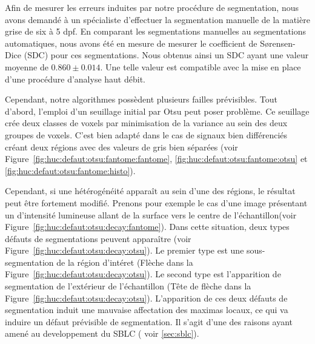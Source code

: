 \documentclass[\main/main.tex]{subfiles}
\begin{document}
Afin de mesurer les erreurs induites par notre procédure de segmentation, nous avons demandé à un spécialiste d'effectuer la segmentation manuelle de la matière grise de six \pzs{} à 5 dpf.
%
En comparant les segmentations manuelles au segmentations automatiques, nous avons été en mesure de mesurer le coefficient de S\o rensen-Dice (SDC) pour ces segmentations.
%
Nous obtenus ainsi un SDC ayant une valeur moyenne de $0.860 \pm{0.014}$.
%
Une telle valeur est compatible avec la mise en place d'une procédure d'analyse haut débit.

%
Cependant, notre algorithmes possèdent plusieurs failles prévisibles. Tout d'abord, l'emploi d'un seuillage initial par Otsu peut poser problème. Ce seuillage crée deux classes de voxels par minimisation de la variance au sein des deux groupes de voxels. C'est bien adapté dans le cas de signaux bien différenciés créant deux régions avec des valeurs de gris bien séparées
(voir Figure~\ref{fig:huc:defaut:otsu:fantome:fantome},
\ref{fig:huc:defaut:otsu:fantome:otsu}
et \ref{fig:huc:defaut:otsu:fantome:histo}).

%
Cependant, si une hétérogénéité apparaît au sein d'une des régions, le résultat peut être fortement modifié.
%
Prenons pour exemple le cas d'une image présentant un d'intensité lumineuse allant de la surface vers le centre de l'échantillon(voir Figure~\ref{fig:huc:defaut:otsu:decay:fantome}).
%
Dans cette situation, deux types défauts de segmentations peuvent apparaître (voir Figure~\ref{fig:huc:defaut:otsu:decay:otsu}).
%
Le premier type est une sous-segmentation de la région d'intéret (Flèche dans la Figure~\ref{fig:huc:defaut:otsu:decay:otsu}).
%
Le second type est l'apparition de segmentation de l'extérieur de l'échantillon (Tête de flèche dans la Figure~\ref{fig:huc:defaut:otsu:decay:otsu}).
%
L'apparition de ces deux défauts de segmentation induit une mauvaise affectation des maximas locaux, ce qui va induire un défaut prévisible de segmentation.
%
Il s'agit d'une des raisons ayant amené au developpement du SBLC ( voir \ref{sec:sblc}). 
\end{document}
